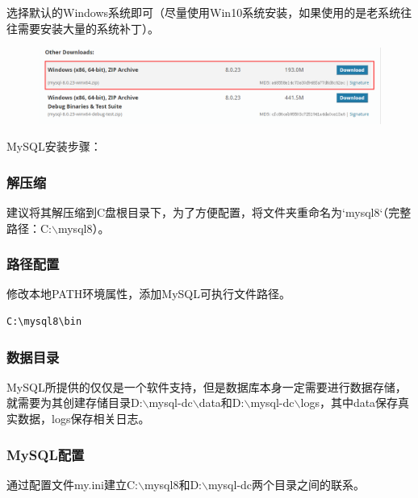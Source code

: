 \documentclass[12pt, openany, oneside]{book}
\begin{document}
选择默认的Windows系统即可（尽量使用Win10系统安装，如果使用的是老系统往往需要安装大量的系统补丁）。\\

\begin{figure}[H]
	\centering
	\includegraphics[scale=0.5]{img/C2/2.png}
\end{figure}

MySQL安装步骤：

\subsubsection{解压缩}

建议将其解压缩到C盘根目录下，为了方便配置，将文件夹重命名为`mysql8`（完整路径：C:$ \backslash $mysql8）。

\subsubsection{路径配置}

修改本地PATH环境属性，添加MySQL可执行文件路径。

\vspace{-0.5cm}

\begin{lstlisting}
C:\mysql8\bin
\end{lstlisting}

\subsubsection{数据目录}

MySQL所提供的仅仅是一个软件支持，但是数据库本身一定需要进行数据存储，就需要为其创建存储目录D:$ \backslash $mysql-dc$ \backslash $data和D:$ \backslash $mysql-dc$ \backslash $logs，其中data保存真实数据，logs保存相关日志。

\subsubsection{MySQL配置}

通过配置文件my.ini建立C:$ \backslash $mysql8和D:$ \backslash $mysql-dc两个目录之间的联系。\\
\end{document}
